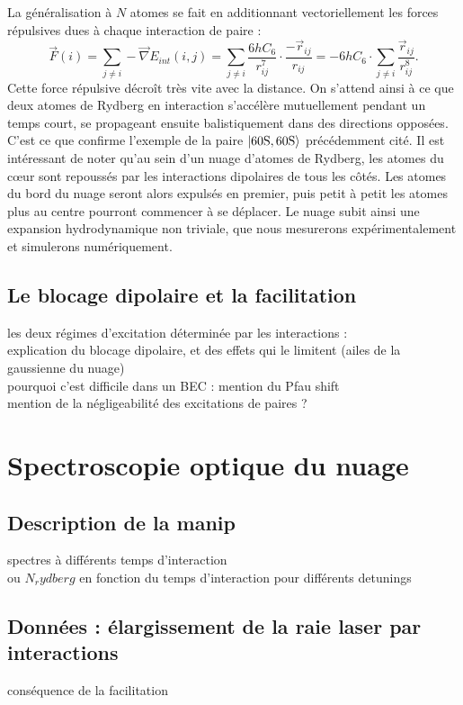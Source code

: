 La généralisation à $N$ atomes se fait en additionnant vectoriellement les forces répulsives dues à chaque interaction de paire :
\begin{equation}
\label{eq:repuls_Natomes}
\vec{F}(i) =  \sum_{j\neq i} -\vec{\nabla}E_{int}(i,j)
= \sum_{j\neq i} \frac{6hC_6}{r_{ij}^7} \cdot \frac{-\vec{r}_{ij}}{r_{ij}}
= - 6hC_6 \cdot \sum_{j\neq i} \frac{\vec{r}_{ij}}{r_{ij}^8}.
\end{equation}
%
Cette force répulsive décroît très vite avec la distance.
On s'attend ainsi à ce que deux atomes de Rydberg en interaction s'accélère mutuellement pendant un temps court, se propageant ensuite balistiquement dans des directions opposées.
C'est ce que confirme l'exemple de la paire $\ket{\mathrm{60S,60S}}$ précédemment cité.
Il est intéressant de noter qu'au sein d'un nuage d'atomes de Rydberg, les atomes du c\oe ur  sont repoussés par les interactions dipolaires de tous les côtés.
Les atomes du bord du nuage seront alors expulsés en premier, puis petit à petit les atomes plus au centre pourront commencer à se déplacer.
Le nuage subit ainsi une expansion hydrodynamique non triviale, que nous mesurerons expérimentalement et simulerons numériquement.

	\subsection{Le blocage dipolaire et la facilitation}
		\noindent les deux régimes d'excitation déterminée par les interactions :\\
		explication du blocage dipolaire, et des effets qui le limitent (ailes de la gaussienne du nuage) \\
		pourquoi c'est difficile dans un BEC : mention du Pfau shift \\
		mention de la négligeabilité des excitations de paires ?

\section{Spectroscopie optique du nuage}
	\subsection{Description de la manip}
		\noindent spectres à différents temps d'interaction\\
		ou $N_rydberg$ en fonction du temps d'interaction pour différents detunings
		
	\subsection{Données : élargissement de la raie laser par interactions}
		\noindent conséquence de la facilitation
		
